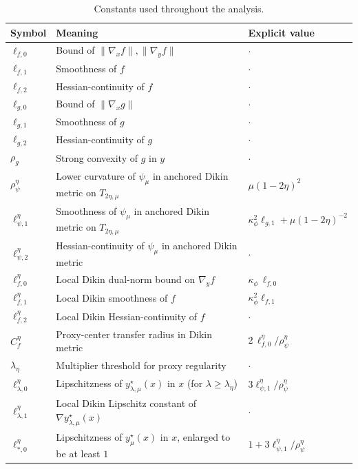 \documentclass{article}
\begin{document}
\begin{table}[h]
\centering
\small
\renewcommand{\arraystretch}{1.25}
\caption{Constants used throughout the analysis.}
\begin{tabularx}{\textwidth}{|l|X|l|}
\hline
\textbf{Symbol} & \textbf{Meaning} & \textbf{Explicit value} \\
\hline
$\ell_{f,0}$ & Bound of $\|\nabla_x f\|, \|\nabla_y f\|$ & $\cdot$ \\
\hline
$\ell_{f,1}$ & Smoothness of $f$ & $\cdot$ \\
\hline
$\ell_{f,2}$ & Hessian-continuity of $f$  & $\cdot$ \\
\hline
$\ell_{g,0}$ & Bound of $\|\nabla_x g\|$ & $\cdot$ \\
\hline
$\ell_{g,1}$ & Smoothness of $g$ & $\cdot$ \\
\hline
$\ell_{g,2}$ & Hessian-continuity of $g$ & $\cdot$ \\
\hline
$\rho_g$ & Strong convexity of $g$ in $y$ & $\cdot$ \\
\hline
$\rho_\psi^\eta$ & Lower curvature of $\psi_\mu$ in anchored Dikin metric on $T_{2\eta,\mu}$ & $\mu(1-2\eta)^2$ \\
\hline
$\ell_{\psi,1}^\eta$ & Smoothness of $\psi_\mu$ in anchored Dikin metric on $T_{2\eta,\mu}$ & $\kappa_\phi^2\ell_{g,1}+\mu(1-2\eta)^{-2}$ \\
\hline
$\ell_{\psi,2}^\eta$ & Hessian-continuity of $\psi_\mu$ in anchored Dikin metric & $\cdot$ \\
\hline
$\ell_{f,0}^\eta$ & Local Dikin dual-norm bound on $\nabla_y f$ & $\kappa_\phi\,\ell_{f,0}$ \\
\hline
$\ell_{f,1}^\eta$ & Local Dikin smoothness of $f$ & $\kappa_\phi^2\ell_{f,1}$ \\
\hline
$\ell_{f,2}^\eta$ & Local Dikin Hessian-continuity of $f$ & $\cdot$ \\
\hline
$C_f^\eta$ & Proxy-center transfer radius in Dikin metric & $2\,\ell_{f,0}^\eta/\rho_\psi^\eta$ \\
\hline
$\lambda_\eta$ & Multiplier threshold for proxy regularity & $\cdot$ \\
\hline
$\ell_{\lambda,0}^\eta$ & Lipschitzness of $y_{\lambda,\mu}^\star(x)$ in $x$ (for $\lambda\ge\lambda_\eta$) & $3\ell_{\psi,1}^\eta/\rho_\psi^\eta$ \\
\hline
$\ell_{\lambda,1}^\eta$ & Local Dikin Lipschitz constant of $\nabla y_{\lambda,\mu}^\star(x)$ & $\cdot$ \\
\hline
$\ell_{*,0}^\eta$ & Lipschitzness of $y_\mu^\star(x)$ in $x$, enlarged to be at least \(1\) & $1+3\ell_{\psi,1}^\eta/\rho_\psi^\eta$ \\

\end{tabularx}
\end{table}
\end{document}
